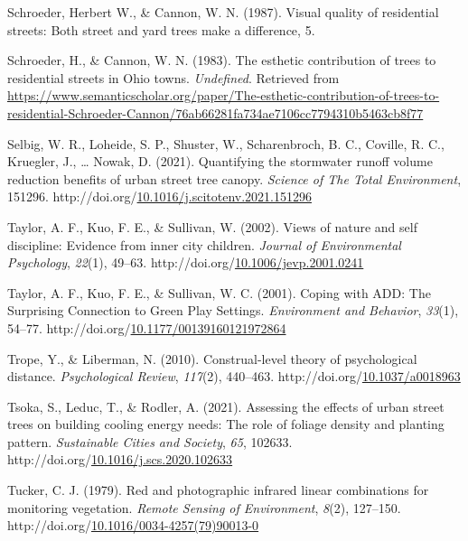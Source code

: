 \documentclass[12pt,twoside]{reedthesis}
\newlength{\cslhangindent}
\newenvironment{CSLReferences}[2] %
 {%
  \setlength{\parindent}{0pt}
  \ifodd #1 \everypar{\setlength{\hangindent}{\cslhangindent}}\ignorespaces\fi
  \ifnum #2 > 0
  \setlength{\parskip}{#2\baselineskip}
  \fi
 }%
 {}
\begin{document}
\begin{CSLReferences}{1}{0}
\leavevmode{}%
Schroeder, Herbert W., \& Cannon, W. N. (1987). Visual quality of residential streets: Both street and yard trees make a difference, 5.

\leavevmode{}%
Schroeder, H., \& Cannon, W. N. (1983). The esthetic contribution of trees to residential streets in Ohio towns. \emph{Undefined}. Retrieved from \url{https://www.semanticscholar.org/paper/The-esthetic-contribution-of-trees-to-residential-Schroeder-Cannon/76ab66281fa734ae7106cc7794310b5463cb8f77}

\leavevmode{}%
Selbig, W. R., Loheide, S. P., Shuster, W., Scharenbroch, B. C., Coville, R. C., Kruegler, J., \ldots{} Nowak, D. (2021). Quantifying the stormwater runoff volume reduction benefits of urban street tree canopy. \emph{Science of The Total Environment}, 151296. http://doi.org/\href{https://doi.org/10.1016/j.scitotenv.2021.151296}{10.1016/j.scitotenv.2021.151296}

\leavevmode{}%
Taylor, A. F., Kuo, F. E., \& Sullivan, W. (2002). Views of nature and self discipline: Evidence from inner city children. \emph{Journal of Environmental Psychology}, \emph{22}(1), 49--63. http://doi.org/\href{https://doi.org/10.1006/jevp.2001.0241}{10.1006/jevp.2001.0241}

\leavevmode{}%
Taylor, A. F., Kuo, F. E., \& Sullivan, W. C. (2001). Coping with ADD: The Surprising Connection to Green Play Settings. \emph{Environment and Behavior}, \emph{33}(1), 54--77. http://doi.org/\href{https://doi.org/10.1177/00139160121972864}{10.1177/00139160121972864}

\leavevmode{}%
Trope, Y., \& Liberman, N. (2010). Construal-level theory of psychological distance. \emph{Psychological Review}, \emph{117}(2), 440--463. http://doi.org/\href{https://doi.org/10.1037/a0018963}{10.1037/a0018963}

\leavevmode{}%
Tsoka, S., Leduc, T., \& Rodler, A. (2021). Assessing the effects of urban street trees on building cooling energy needs: The role of foliage density and planting pattern. \emph{Sustainable Cities and Society}, \emph{65}, 102633. http://doi.org/\href{https://doi.org/10.1016/j.scs.2020.102633}{10.1016/j.scs.2020.102633}

\leavevmode{}%
Tucker, C. J. (1979). Red and photographic infrared linear combinations for monitoring vegetation. \emph{Remote Sensing of Environment}, \emph{8}(2), 127--150. http://doi.org/\href{https://doi.org/10.1016/0034-4257(79)90013-0}{10.1016/0034-4257(79)90013-0}


\end{CSLReferences}
\end{document}
